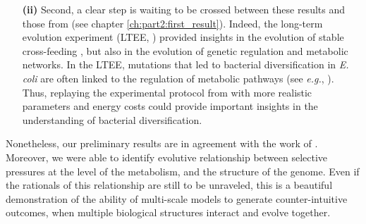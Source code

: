 \begin{enumerate}
\item[\textbf{(ii)}] Second, a clear step is waiting to be crossed between these results and those from \cite{rocabert-et-al-2017} (see chapter \ref{ch:part2:first_result}). Indeed, the long-term evolution experiment (LTEE, \citealt{elena-and-lenski-2003}) provided insights in the evolution of stable cross-feeding \citep{rozen-et-al-2005}, but also in the evolution of genetic regulation and metabolic networks. In the LTEE, mutations that led to bacterial diversification in \textit{E. coli} are often linked to the regulation of metabolic pathways (see \textit{e.g.}, \citealt{grosskopf-et-al-2016}). Thus, replaying the experimental protocol from \cite{rocabert-et-al-2017} with more realistic parameters and energy costs could provide important insights in the understanding of bacterial diversification.
\end{enumerate}

Nonetheless, our preliminary results are in agreement with the work of \cite{weisse-et-al-2015}. Moreover, we were able to identify evolutive relationship between selective pressures at the level of the metabolism, and the structure of the genome. Even if the rationals of this relationship are still to be unraveled, this is a beautiful demonstration of the ability of multi-scale models to generate counter-intuitive outcomes, when multiple biological structures interact and evolve together.




